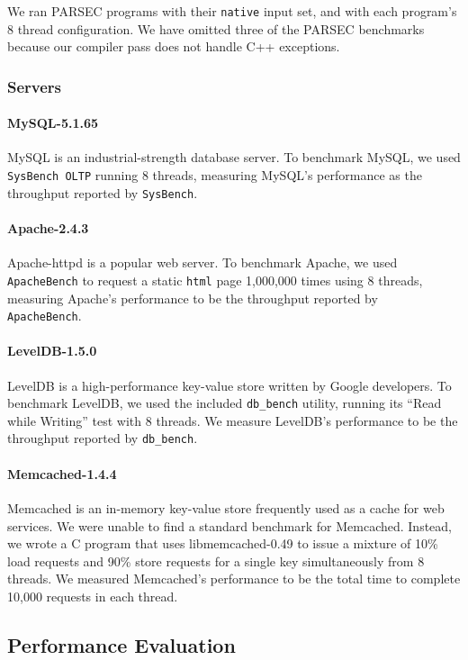 \documentclass[pageno,nohyperref]{jpaper}
\begin{document}
We ran PARSEC programs with their {\tt native} input set, and with each
program's 8 thread configuration. We have omitted three of the PARSEC
benchmarks because our compiler pass does not handle C++ exceptions.    

\subsubsection{Servers}


\paragraph{MySQL-5.1.65} MySQL is an industrial-strength database server. To
benchmark MySQL, we used {\tt SysBench OLTP} running 8 threads, measuring
MySQL's performance as the throughput reported by {\tt SysBench}.  

\paragraph{Apache-2.4.3} 
Apache-httpd is a popular web server.  To benchmark Apache, we used {\tt
ApacheBench} to request a static {\tt html} page 1,000,000 times using 8
threads, measuring Apache's performance to be the throughput reported by {\tt
ApacheBench}.  

\paragraph{LevelDB-1.5.0}
LevelDB is a high-performance key-value store written by Google
developers. To benchmark LevelDB, we used the included {\tt db\_bench} utility,
running its ``Read while Writing'' test with 8 threads.  We measure LevelDB's
performance to be the throughput reported by {\tt db\_bench}.

\paragraph{Memcached-1.4.4}
Memcached is an in-memory key-value store frequently used as a cache for web
services.  We were unable to find a standard benchmark for Memcached.  Instead,
we wrote a C program that uses libmemcached-0.49 to issue a
mixture of 10\% load requests and 90\% store requests for a single key 
simultaneously from 8 threads.  We measured Memcached's performance to be the
total time to complete 10,000 requests in each thread.



\subsection{Performance Evaluation}
\label{sec:eval:perf}
\end{document}
